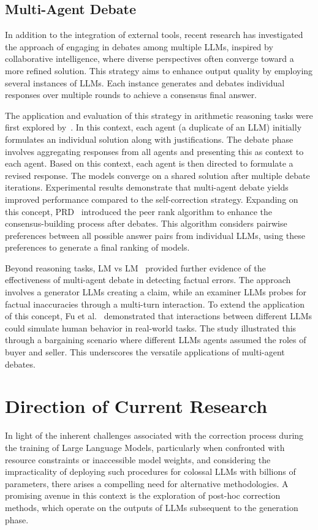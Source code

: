 \documentclass[a4paper,oneside]{book}
\begin{document}
\subsection{Multi-Agent Debate}
In addition to the integration of external tools, recent research has investigated the approach of engaging in debates among multiple LLMs, inspired by collaborative intelligence, where diverse perspectives often converge toward a more refined solution. This strategy aims to enhance output quality by employing several instances of LLMs. Each instance generates and debates individual responses over multiple rounds to achieve a consensus final answer.

The application and evaluation of this strategy in arithmetic reasoning tasks were first explored by~\cite{du2023improving}. In this context, each agent (a duplicate of an LLM) initially formulates an individual solution along with justifications. The debate phase involves aggregating responses from all agents and presenting this as context to each agent. Based on this context, each agent is then directed to formulate a revised response. The models converge on a shared solution after multiple debate iterations. Experimental results demonstrate that multi-agent debate yields improved performance compared to the self-correction strategy. Expanding on this concept, PRD~\cite{li2023prd} introduced the peer rank algorithm to enhance the consensus-building process after debates. This algorithm considers pairwise preferences between all possible answer pairs from individual LLMs, using these preferences to generate a final ranking of models.

Beyond reasoning tasks, LM vs LM~\cite{cohen2023lm} provided further evidence of the effectiveness of multi-agent debate in detecting factual errors. The approach involves a generator LLMs creating a claim, while an examiner LLMs probes for factual inaccuracies through a multi-turn interaction. To extend the application of this concept, Fu et al.~\cite{fu2023improving} demonstrated that interactions between different LLMs could simulate human behavior in real-world tasks. The study illustrated this through a bargaining scenario where different LLMs agents assumed the roles of buyer and seller. This underscores the versatile applications of multi-agent debates.

\section{Direction of Current Research}
In light of the inherent challenges associated with the correction process during the training of Large Language Models, particularly when confronted with resource constraints or inaccessible model weights, and considering the impracticality of deploying such procedures for colossal LLMs with billions of parameters, there arises a compelling need for alternative methodologies. A promising avenue in this context is the exploration of post-hoc correction methods, which operate on the outputs of LLMs subsequent to the generation phase.
\end{document}
